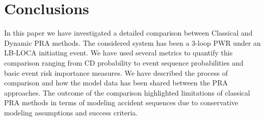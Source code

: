 \section{Conclusions}
\label{sec:conclusions}

In this paper we have investigated a detailed comparison between Classical and Dynamic PRA methods.
The considered system has been a 3-loop PWR under an LB-LOCA initiating event.
We have used several metrics to quantify this comparison ranging from CD probability to event 
sequence probabilities and basic event risk importance measures.
We have described the process of comparison and how the model data has been shared between the PRA
approaches.
The outcome of the comparison highlighted limitations of classical PRA methods in terms of modeling
accident sequences due to conservative modeling assumptions and success criteria.

